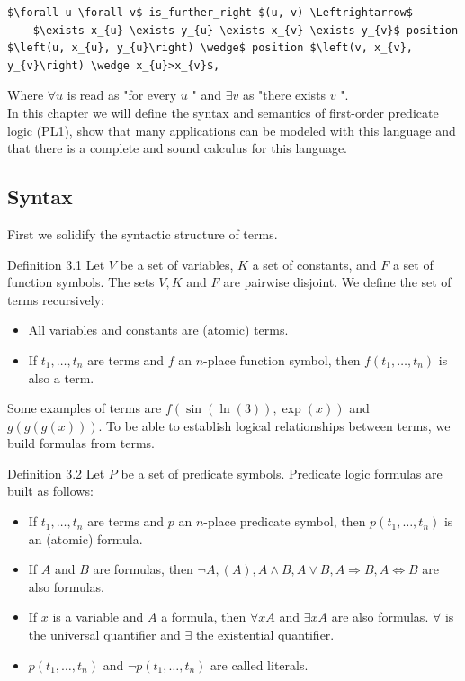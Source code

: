 \documentclass[10pt]{book}
\begin{document}
\begin{verbatim}
$\forall u \forall v$ is_further_right $(u, v) \Leftrightarrow$
    $\exists x_{u} \exists y_{u} \exists x_{v} \exists y_{v}$ position $\left(u, x_{u}, y_{u}\right) \wedge$ position $\left(v, x_{v}, y_{v}\right) \wedge x_{u}>x_{v}$,
\end{verbatim}

Where $\forall u$ is read as "for every $u$ " and $\exists v$ as "there exists $v$ ".\\
In this chapter we will define the syntax and semantics of first-order predicate logic (PL1), show that many applications can be modeled with this language and that there is a complete and sound calculus for this language.

\subsection{Syntax}
First we solidify the syntactic structure of terms.

Definition 3.1 Let $V$ be a set of variables, $K$ a set of constants, and $F$ a set of function symbols. The sets $V, K$ and $F$ are pairwise disjoint. We define the set of terms recursively:

\begin{itemize}
  \item All variables and constants are (atomic) terms.
  \item If $t_{1}, \ldots, t_{n}$ are terms and $f$ an $n$-place function symbol, then $f\left(t_{1}, \ldots, t_{n}\right)$ is also a term.
\end{itemize}

Some examples of terms are $f(\sin (\ln (3)), \exp (x))$ and $g(g(g(x)))$. To be able to establish logical relationships between terms, we build formulas from terms.

Definition 3.2 Let $P$ be a set of predicate symbols. Predicate logic formulas are built as follows:

\begin{itemize}
  \item If $t_{1}, \ldots, t_{n}$ are terms and $p$ an $n$-place predicate symbol, then $p\left(t_{1}, \ldots, t_{n}\right)$ is an (atomic) formula.
  \item If $A$ and $B$ are formulas, then $\neg A,(A), A \wedge B, A \vee B, A \Rightarrow B, A \Leftrightarrow B$ are also formulas.
  \item If $x$ is a variable and $A$ a formula, then $\forall x A$ and $\exists x A$ are also formulas. $\forall$ is the universal quantifier and $\exists$ the existential quantifier.
  \item $p\left(t_{1}, \ldots, t_{n}\right)$ and $\neg p\left(t_{1}, \ldots, t_{n}\right)$ are called literals.
\end{itemize}
\end{document}

